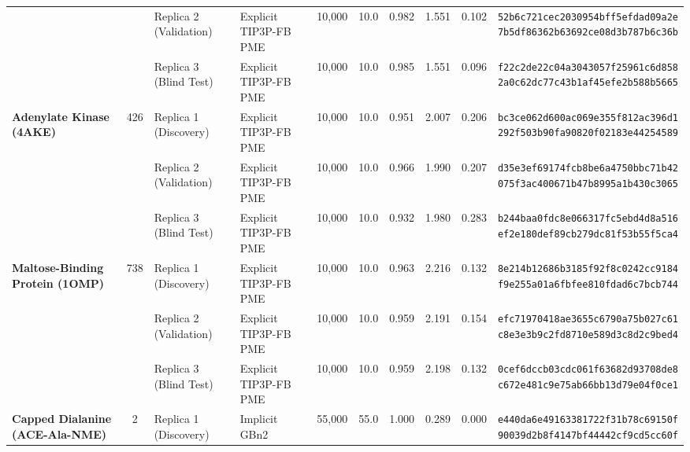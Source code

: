 \documentclass[10pt,letterpaper]{article}
\begin{document}
{\begin{longtable}{@{}l c l l r r c c c l@{}}
 &  & Replica 2 (Validation) & Explicit TIP3P-FB PME & 10,000 & 10.0 & 0.982 & 1.551 & 0.102 & \shortstack[l]{\texttt{52b6c721cec2030954bff5efdad09a2e}\\\texttt{7b5df86362b63692ce08d3b787b6c36b}} \\

 &  & Replica 3 (Blind Test) & Explicit TIP3P-FB PME & 10,000 & 10.0 & 0.985 & 1.551 & 0.096 & \shortstack[l]{\texttt{f22c2de22c04a3043057f25961c6d858}\\\texttt{2a0c62dc77c43b1af45efe2b588b5665}} \\
\midrule[0.35pt]
\textbf{Adenylate Kinase (4AKE)} & 426 & Replica 1 (Discovery) & Explicit TIP3P-FB PME & 10,000 & 10.0 & 0.951 & 2.007 & 0.206 & \shortstack[l]{\texttt{bc3ce062d600ac069e355f812ac396d1}\\\texttt{292f503b90fa90820f02183e44254589}} \\

 &  & Replica 2 (Validation) & Explicit TIP3P-FB PME & 10,000 & 10.0 & 0.966 & 1.990 & 0.207 & \shortstack[l]{\texttt{d35e3ef69174fcb8be6a4750bbc71b42}\\\texttt{075f3ac400671b47b8995a1b430c3065}} \\

 &  & Replica 3 (Blind Test) & Explicit TIP3P-FB PME & 10,000 & 10.0 & 0.932 & 1.980 & 0.283 & \shortstack[l]{\texttt{b244baa0fdc8e066317fc5ebd4d8a516}\\\texttt{ef2e180def89cb279dc81f53b55f5ca4}} \\
\midrule[0.35pt]
\textbf{Maltose-Binding Protein (1OMP)} & 738 & Replica 1 (Discovery) & Explicit TIP3P-FB PME & 10,000 & 10.0 & 0.963 & 2.216 & 0.132 & \shortstack[l]{\texttt{8e214b12686b3185f92f8c0242cc9184}\\\texttt{f9e255a01a6fbfee810fdad6c7bcb744}} \\

 &  & Replica 2 (Validation) & Explicit TIP3P-FB PME & 10,000 & 10.0 & 0.959 & 2.191 & 0.154 & \shortstack[l]{\texttt{efc71970418ae3655c6790a75b027c61}\\\texttt{c8e3e3b9c2fd8710e589d3c8d2c9bed4}} \\

 &  & Replica 3 (Blind Test) & Explicit TIP3P-FB PME & 10,000 & 10.0 & 0.959 & 2.198 & 0.132 & \shortstack[l]{\texttt{0cef6dccb03cdc061f63682d93708de8}\\\texttt{c672e481c9e75ab66bb13d79e04f0ce1}} \\
\midrule[0.35pt]
\textbf{Capped Dialanine (ACE-Ala-NME)} & 2 & Replica 1 (Discovery) & Implicit GBn2 & 55,000 & 55.0 & 1.000 & 0.289 & 0.000 & \shortstack[l]{\texttt{e440da6e49163381722f31b78c69150f}\\\texttt{90039d2b8f4147bf44442cf9cd5cc60f}} \\


\end{longtable}}
\end{document}
